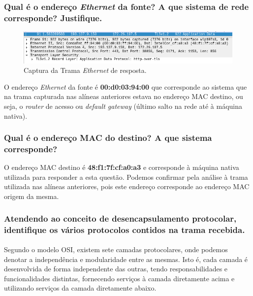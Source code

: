 \subsubsection{Qual é o endereço \textit{Ethernet} da fonte? A que sistema de rede corresponde? Justifique.}

    \begin{figure}[H]
    \centering
    \includegraphics[width=500pt]{prints/Questao3/questao3-respostaServer.png}
    \caption{Captura da Trama \textit{Ethernet} de resposta.} \label{questao3-resposta1}
    \end{figure}


    \par O endereço \textit{Ethernet} da fonte é \textbf{00:d0:03:94:00} que corresponde ao sistema que na trama capturada nas alíneas anteriores estava no endereço MAC destino, ou seja, o \textit{router} de acesso ou \textit{default gateway} (último salto na rede até à máquina nativa).





\subsubsection{Qual é o endereço MAC do destino? A que sistema corresponde?}

    \par O endereço MAC destino é \textbf{48:f1:7f:cf:a0:a3} e corresponde à máquina nativa utilizada para responder a esta questão. Podemos confirmar pela análise à trama utilizada nas alíneas anteriores, pois este endereço corresponde ao endereço MAC origem da mesma.




\subsubsection{Atendendo ao conceito de desencapsulamento protocolar, identifique os vários protocolos contidos na trama recebida.}

    \paragraph{}
    \par Segundo o modelo OSI, existem sete camadas protocolares, onde podemos denotar a independência e modularidade entre as mesmas. Isto é, cada camada é desenvolvida de forma independente das outras, tendo responsabilidades e funcionalidades distintas, fornecendo serviços à camada diretamente acima e utilizando serviços da camada diretamente abaixo.
    
